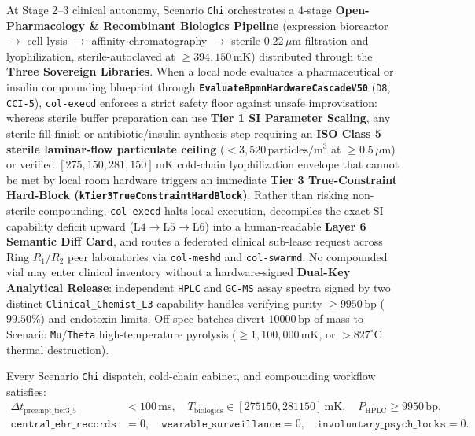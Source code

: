 At Stage 2--3 clinical autonomy, Scenario \texttt{Chi} orchestrates a 4-stage \textbf{Open-Pharmacology \& Recombinant Biologics Pipeline} (expression
bioreactor $\to$ cell lysis $\to$ affinity chromatography $\to$ sterile $0.22\,\mu\mathrm{m}$ filtration and lyophilization, sterile-autoclaved at
$\ge 394{,}150\,\mathrm{mK}$) distributed through the \textbf{Three Sovereign Libraries}. When a local node evaluates a pharmaceutical or insulin
compounding blueprint through \textbf{\texttt{EvaluateBpmnHardwareCascadeV50}} (\texttt{D8}, \texttt{CCI-5}), \texttt{col-execd} enforces a strict safety
floor against unsafe improvisation: whereas sterile buffer preparation can use \textbf{Tier 1 SI Parameter Scaling}, any sterile fill-finish or
antibiotic/insulin synthesis step requiring an \textbf{ISO Class 5 sterile laminar-flow particulate ceiling} ($< 3{,}520\,\mathrm{particles/m^3}$ at
$\ge 0.5\,\mu\mathrm{m}$) or verified $[275{,}150, 281{,}150]\,\mathrm{mK}$ cold-chain lyophilization envelope that cannot be met by local room hardware
triggers an immediate \textbf{Tier 3 True-Constraint Hard-Block (\texttt{kTier3TrueConstraintHardBlock})}. Rather than risking non-sterile compounding,
\texttt{col-execd} halts local execution, decompiles the exact SI capability deficit upward ($\mathrm{L4} \to \mathrm{L5} \to \mathrm{L6}$) into a
human-readable \textbf{Layer 6 Semantic Diff Card}, and routes a federated clinical sub-lease request across Ring $R_1$/$R_2$ peer laboratories via
\texttt{col-meshd} and \texttt{col-swarmd}. No compounded vial may enter clinical inventory without a hardware-signed \textbf{Dual-Key Analytical
Release}: independent \texttt{HPLC} and \texttt{GC-MS} assay spectra signed by two distinct \texttt{Clinical\_Chemist\_L3} capability handles verifying
purity $\ge 9950\,\mathrm{bp}$ ($99.50\%$) and endotoxin limits. Off-spec batches divert $10000\,\mathrm{bp}$ of mass to Scenario \texttt{Mu}/\texttt{Theta}
high-temperature pyrolysis ($\ge 1{,}100{,}000\,\mathrm{mK}$, or $> 827^\circ\mathrm{C}$ thermal destruction).

\begin{invariant}
\label{inv:chi-clinical}
Every Scenario \texttt{Chi} dispatch, cold-chain cabinet, and compounding workflow satisfies:
\begin{align}
\Delta t_{\mathrm{preempt\_tier3\_5}} &< 100\,\mathrm{ms}, \quad T_{\mathrm{biologics}} \in [275150, 281150]\,\mathrm{mK}, \quad P_{\mathrm{HPLC}} \ge 9950\,\mathrm{bp}, \\
\mathtt{central\_ehr\_records} &= 0, \quad \mathtt{wearable\_surveillance} = 0, \quad \mathtt{involuntary\_psych\_locks} = 0.
\end{align}
\end{invariant}

